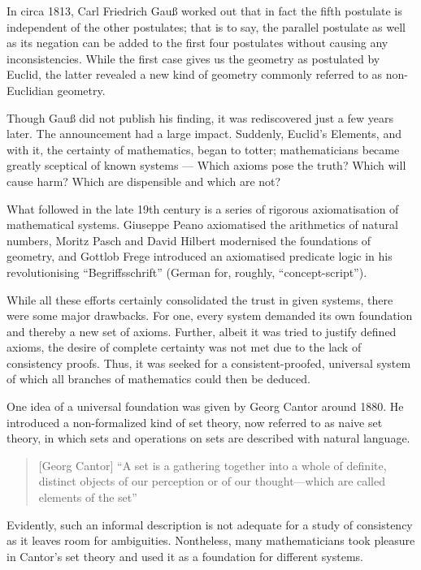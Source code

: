 \documentclass[hidelinks]{article}
\theoremstyle{plain}
\theoremstyle{definition}
\theoremstyle{rem}
\begin{document}
In circa 1813, Carl Friedrich Gauß worked out that in fact the fifth postulate is independent of the other postulates; that is to say, the parallel postulate as well as its negation can be added to the first four postulates without causing any inconsistencies. While the first case gives us the geometry as postulated by Euclid, the latter revealed a new kind of geometry commonly referred to as non-Euclidian geometry.

Though Gauß did not publish his finding, it was rediscovered just a few years later. The announcement had a large impact. Suddenly, Euclid's Elements, and with it, the certainty of mathematics, began to totter; mathematicians became greatly sceptical of known systems --- Which axioms pose the truth? Which will cause harm? Which are dispensible and which are not?

What followed in the late 19th century is a series of rigorous axiomatisation of mathematical systems. Giuseppe Peano axiomatised the arithmetics of natural numbers, Moritz Pasch and David Hilbert modernised the foundations of geometry, and Gottlob Frege introduced an axiomatised predicate logic in his revolutionising ``Begriffsschrift'' (German for, roughly, ``concept-script'').

While all these efforts certainly consolidated the trust in given systems, there were some major drawbacks. For one, every system demanded its own foundation and thereby a new set of axioms. Further, albeit it was tried to justify defined axioms, the desire of complete certainty was not met due to the lack of consistency proofs. Thus, it was seeked for a consistent-proofed, universal system of which all branches of mathematics could then be deduced.

One idea of a universal foundation was given by Georg Cantor around 1880. He introduced a non-formalized kind of set theory, now referred to as naive set theory, in which sets and operations on sets are described with natural language. 

\begin{quote}[Georg Cantor]
``A set is a gathering together into a whole of definite, distinct objects of our perception or of our thought—which are called elements of the set''\cite{cantor_set}
\end{quote}

Evidently, such an informal description is not adequate for a study of consistency as it leaves room for ambiguities. Nontheless, many mathematicians took pleasure in Cantor's set theory and used it as a foundation for different systems.
\end{document}
